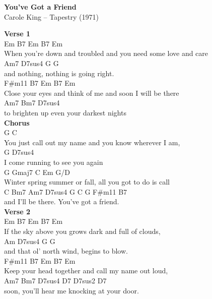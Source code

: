 \documentclass[a4paper]{article}
\begin{document}
    \begin{center}
        \textbf{You've Got a Friend}
        ~\\
        Carole King -- Tapestry (1971)
    \end{center}
    {
        \scriptsize
        \textbf{Verse 1}
        ~\\
        {
            \cutive
            \obeyspaces
            Em       B7               Em        B7       Em
\\
When you're down and troubled and you need some love and care
\\
    Am7      D7sus4           G      G
\\
and nothing, nothing is going right.
\\
F\#m11               B7              Em   B7        Em
\\
Close your eyes and think of me and soon I will be there
\\
   Am7         Bm7               D7sus4
\\
to brighten up even your darkest nights
\\

        }
        \textbf{Chorus}
        ~\\
        {
            \cutive
            \obeyspaces
         G                        C
\\
You just call out my name and you know wherever I am,
\\
       G                   D7sus4
\\
I come running to see you again
\\
G                       Gmaj7 C                    Em   G/D
\\
Winter spring summer or fall, all you got to do is call
\\
         C  Bm7  Am7  D7sus4       G       C     G    F\#m11 B7
\\
and I'll be there.    You've got a friend.
\\

        }
        \textbf{Verse 2}
        ~\\
        {
            \cutive
            \obeyspaces
       Em   B7             Em       B7      Em
\\
If the sky above you grows dark and full of clouds,
\\
    Am             D7sus4          G     G
\\
and that ol' north wind, begins to blow.
\\
F\#m11            B7         Em      B7       Em
\\
Keep your head together and call my name out loud,
\\
Am7                  Bm7              D7sus4 D7  D7sus2    D7
\\
soon, you'll hear me knocking at your door.
\\

}}
\end{document}
